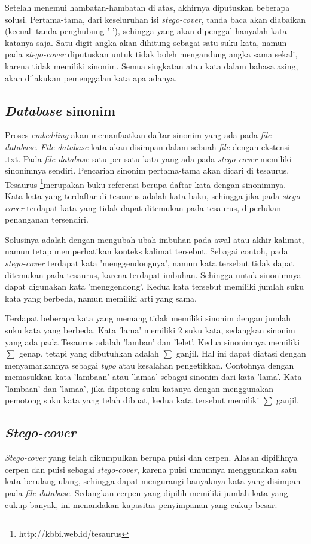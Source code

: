 Setelah menemui hambatan-hambatan di atas, akhirnya diputuskan beberapa solusi. Pertama-tama, dari keseluruhan isi \textit{stego-cover}, tanda baca akan diabaikan (kecuali tanda penghubung '-'), sehingga yang akan dipenggal hanyalah kata-katanya saja. Satu digit angka akan dihitung sebagai satu suku kata, namun pada \textit{stego-cover} diputuskan untuk tidak boleh mengandung angka sama sekali, karena tidak memiliki sinonim. Semua singkatan atau kata dalam bahasa asing, akan dilakukan pemenggalan kata apa adanya.

\subsection{\textit{Database} sinonim}
Proses \textit{embedding} akan memanfaatkan daftar sinonim yang ada pada \textit{file database}. \textit{File database} kata akan disimpan dalam sebuah \textit{file} dengan ekstensi .txt. Pada \textit{file database} satu per satu kata yang ada pada \textit{stego-cover} memiliki sinonimnya sendiri. Pencarian sinonim pertama-tama akan dicari di tesaurus. Tesaurus \footnote{http://kbbi.web.id/tesaurus}merupakan buku referensi berupa daftar kata dengan sinonimnya. Kata-kata yang terdaftar di tesaurus adalah kata baku, sehingga jika pada \textit{stego-cover} terdapat kata yang tidak dapat ditemukan pada tesaurus, diperlukan penanganan tersendiri.

Solusinya adalah dengan mengubah-ubah imbuhan pada awal atau akhir kalimat, namun tetap memperhatikan konteks kalimat tersebut. Sebagai contoh, pada \textit{stego-cover} terdapat kata 'menggendongnya', namun kata tersebut tidak dapat ditemukan pada tesaurus, karena terdapat imbuhan. Sehingga untuk sinonimnya dapat digunakan kata 'menggendong'. Kedua kata tersebut memiliki jumlah suku kata yang berbeda, namun memiliki arti yang sama.

Terdapat beberapa kata yang memang tidak memiliki sinonim dengan jumlah suku kata yang berbeda. Kata 'lama' memiliki 2 suku kata, sedangkan sinonim yang ada pada Tesaurus adalah 'lamban' dan 'lelet'. Kedua sinonimnya memiliki $\sum$ genap, tetapi yang dibutuhkan adalah $\sum$ ganjil. Hal ini dapat diatasi dengan menyamarkannya sebagai \textit{typo} atau kesalahan pengetikkan. Contohnya dengan memasukkan kata 'lambaan' atau 'lamaa' sebagai sinonim dari kata 'lama'. Kata 'lambaan' dan 'lamaa', jika dipotong suku katanya dengan menggunakan pemotong suku kata yang telah dibuat, kedua kata tersebut memiliki $\sum$ ganjil.

\subsection{\textit{Stego-cover}}
\textit{Stego-cover} yang telah dikumpulkan berupa puisi dan cerpen. Alasan dipilihnya cerpen dan puisi sebagai \textit{stego-cover}, karena puisi umumnya menggunakan satu kata berulang-ulang, sehingga dapat mengurangi banyaknya kata yang disimpan pada \textit{file database}. Sedangkan cerpen yang dipilih memiliki jumlah kata yang cukup banyak, ini menandakan kapasitas penyimpanan yang cukup besar.

